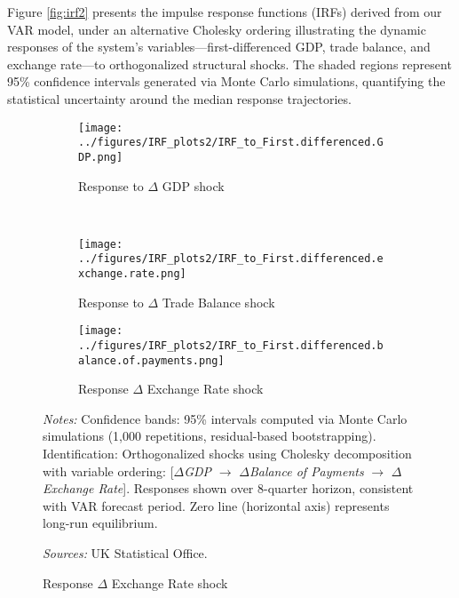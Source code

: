 \documentclass[
]{article}
\begin{document}
Figure \ref{fig:irf2} presents the impulse response functions (IRFs) derived from our VAR model, 
under an alternative Cholesky ordering
illustrating the dynamic responses of the system’s variables—first-differenced GDP, 
trade balance, and exchange rate—to orthogonalized structural shocks. The 
shaded regions represent 95\% confidence intervals generated via Monte Carlo 
simulations, quantifying the statistical uncertainty around the median response
trajectories. 

\begin{figure}[!htbp]
\centering
\caption{\textsc{Impulse Response Functions}}
\label{fig:irf2}

\begin{subfigure}[b]{0.32\textwidth}
    \centering
    \texttt{[image: ../figures/IRF\_plots2/IRF\_to\_First.differenced.GDP.png]}
    \caption{Response to $\Delta$ GDP shock}
    \label{fig:irf_gdp2}
\end{subfigure}
\\
\begin{subfigure}[b]{0.32\textwidth}
    \centering
    \texttt{[image: ../figures/IRF\_plots2/IRF\_to\_First.differenced.exchange.rate.png]}
    \caption{Response to $\Delta$ Trade Balance shock}
    \label{fig:irf_tb2}
\end{subfigure}
\begin{subfigure}[b]{0.32\textwidth}
    \centering
    \texttt{[image: ../figures/IRF\_plots2/IRF\_to\_First.differenced.balance.of.payments.png]}
    \caption{Response $\Delta$ Exchange Rate shock}
    \label{fig:irf_fx2}
\end{subfigure}

\begin{minipage}{\textwidth}
\footnotesize
\textit{Notes:} Confidence bands: 95\% intervals computed via Monte Carlo simulations (1,000 repetitions, residual-based bootstrapping).
Identification: Orthogonalized shocks using Cholesky decomposition with variable ordering: 
      [$\Delta$\textit{GDP} $\rightarrow$ $\Delta$\textit{Balance of Payments} $\rightarrow$ $\Delta$\textit{Exchange Rate}].
      Responses shown over 8-quarter horizon, 
    consistent with VAR forecast period.
    Zero line (horizontal axis) represents long-run equilibrium.


\textit{Sources:} UK Statistical Office.
\end{minipage}
\end{figure}

\end{document}
